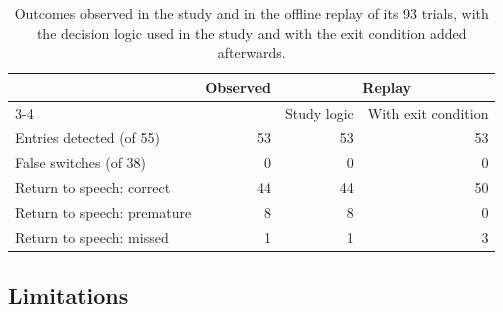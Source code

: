 \begin{table}[htbp]
  \centering
  \caption{Outcomes observed in the study and in the offline replay of its
  93 trials, with the decision logic used in the study and with the exit
  condition added afterwards.}
  \label{tab:ps-replay}
  \begin{tabular}{lrrr}
    \toprule
    & Observed & \multicolumn{2}{c}{Replay} \\
    \cmidrule(lr){3-4}
    & & Study logic & With exit condition \\
    \midrule
    Entries detected (of 55)      & 53 & 53 & 53 \\
    False switches (of 38)        &  0 &  0 &  0 \\
    \addlinespace
    Return to speech: correct     & 44 & 44 & 50 \\
    Return to speech: premature   &  8 &  8 &  0 \\
    Return to speech: missed      &  1 &  1 &  3 \\
    \bottomrule
  \end{tabular}
\end{table}

\subsection{Limitations}

